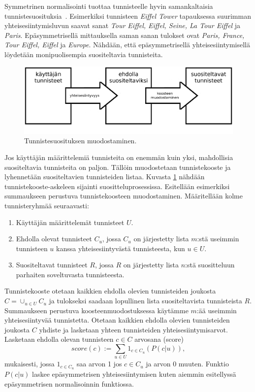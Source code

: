\documentclass[12pt,finnish]{tktltiki2}
\theoremstyle{definition}
\theoremstyle{remark}
\begin{document}
Symmetrinen normalisointi tuottaa tunnisteelle hyvin samankaltaisia tunnistesuosituksia~\cite{Sigurbjornsson:2008:FTR:1367497.1367542}. Esimerkiksi tunnisteen \textit{Eiffel Tower} tapauksessa suurimman yhteisesiintymisluvun saavat sanat \textit{Tour Eiffel, Eiffel, Seine, La Tour Eiffel} ja \textit{Paris}. Epäsymmetrisellä mittauksella saman sanan tulokset ovat \textit{Paris, France, Tour Eiffel, Eiffel} ja \textit{Europe}. Nähdään, että epäsymmetrisellä yhteisesiintymisellä löydetään monipuolisempia suositeltavia tunnisteita.

\begin{figure}[]
\includegraphics[width = 420pt]{tunnisteidensuosittelu.eps}\caption{Tunnistesuosituksen muodostaminen.}
\label{tunnisteidensuosittelu}
\end{figure}

Jos käyttäjän määrittelemiä tunnisteita on enemmän kuin yksi, mahdollisia suositeltavia tunnisteita on paljon. Tällöin muodostetaan tunnistekooste ja lyhennetään suositeltavien tunnisteiden listaa. Kuvasta \ref{tunnisteidensuosittelu} nähdään tunnistekooste-askeleen sijainti suositteluprosessissa.
Esitellään esimerkiksi summaukseen perustuva tunnistekoosteen muodostaminen. Määritellään kolme tunnisteryhmää seuraavasti:
\begin{enumerate}
\item Käyttäjän määrittelemät tunnisteet $U$.

\item Ehdolla olevat tunnisteet $C_{u}$, jossa $C_{u}$ on järjestetty lista $m$:stä useimmin tunnisteen $u$ kanssa yhteisesiintyvästä tunnisteesta, kun $u \in U$.

\item Suositeltavat tunnisteet $R$, jossa $R$ on järjestetty lista $n$:stä suositteluun parhaiten soveltuvasta tunnisteesta.
\end{enumerate}

Tunnistekooste otetaan kaikkien ehdolla olevien tunnisteiden joukosta $C = \cup_{u\in U}C_u$ ja tulokseksi saadaan lopullinen lista suositeltavista tunnisteista $R$. Summaukseen perustuva koosteenmuodostuksessa käytämme $m$:ää useimmin yhteisesiintyvää tunnistetta. Otetaan kaikkien ehdolla olevien tunnisteiden joukosta $C$ yhdiste ja lasketaan yhteen tunnisteiden yhteisesiintymisarvot. Lasketaan ehdolla olevan tunnisteen $c \in C$ arvosana (score)
\begin{displaymath}
score(c) := \sum_{u\in U}1_{c\in C_u}(P(c|u)),
\end{displaymath}
mukaisesti, jossa $1_{c\in C_u}$ saa arvon 1 jos $c\in C_u$ ja arvon 0 muuten. Funktio $P(c|u)$ laskee epäsymmetrisen yhteisesiintymisen kuten aiemmin esitellyssä epäsymmetrisen normalisoinnin funktiossa.
\end{document}
